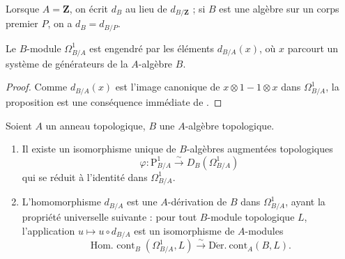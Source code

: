 Lorsque $A=\mathbf{Z}$, on écrit $d_B$ au lieu de $d_{B/\mathbf{Z}}$ ; si $B$
est une algèbre sur un corps premier $P$, on a $d_B=d_{B/P}$.

\begin{proposition}[20.4.7]
\label{0.20.4.7-fr}
Le $B$-module $\Omega^1_{B/A}$ est engendré par les éléments $d_{B/A}(x)$,
où $x$ parcourt un système de générateurs de la $A$-algèbre $B$.
\end{proposition}

\begin{proof}
Comme $d_{B/A}(x)$ est l'image canonique de $x\otimes1-1\otimes x$ dans
$\Omega^1_{B/A}$, la proposition est une conséquence immédiate de
.
\end{proof}

\begin{theorem}[20.4.8]
\label{0.20.4.8-fr}
Soient $A$ un anneau topologique, $B$ une $A$-algèbre topologique.
\begin{enumerate}
  \item[\rm(i)] Il existe un isomorphisme unique de $B$-algèbres augmentées
  topologiques
\begin{equation}
\tag{20.4.8.1}
\label{0.20.4.8.1-fr}
  \varphi:\mathrm{P}^1_{B/A}\xrightarrow{\sim}D_B(\Omega^1_{B/A})
\end{equation}
qui se réduit à l'identité dans $\Omega^1_{B/A}$.
  \item[\rm(ii)] L'homomorphisme $d_{B/A}$ est une $A$-dérivation de $B$
  dans $\Omega^1_{B/A}$, ayant la propriété universelle suivante : pour tout
  $B$-module topologique $L$, l'application $u\mapsto u\circ d_{B/A}$ est
  un isomorphisme de $A$-modules
\begin{equation}
\tag{20.4.8.2}
\label{0.20.4.8.2-fr}
  \operatorname{Hom.\ cont}_B(\Omega^1_{B/A},L)
  \xrightarrow{\sim}\operatorname{D\acute{e}r.\ cont}_A(B,L).
\end{equation}
\end{enumerate}
\end{theorem}

